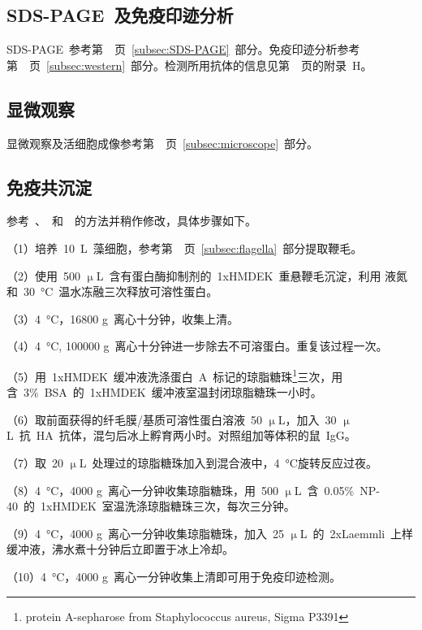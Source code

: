 \subsection{SDS-PAGE\ 及免疫印迹分析}
SDS-PAGE\ 参考第\ \pageref{subsec:SDS-PAGE}\ 页\ \ref{subsec:SDS-PAGE}\ 部分。免疫印迹分析参考
第\ \pageref{subsec:western}\ 页\ \ref{subsec:western}\ 部分。检测所用抗体的信息见第\
\pageref{appen:H}\ 页的附录\ H。

\subsection{显微观察}
显微观察及活细胞成像参考第\ \pageref{subsec:microscope}\ 页\ \ref{subsec:microscope}\ 部分。

\subsection{免疫共沉淀}\label{subsec:CoIP}
参考\ \citet{Richey2013}、\citet{Fowkes1998}\ 和\ \citet{Silva2012}\ 的方法并稍作修改，具体步骤如下。

（1）培养\ \SI{10}{\L}\ 藻细胞，参考第\ \pageref{subsec:flagella}\ 页\ \ref{subsec:flagella}\ 部分提取鞭毛。

（2）使用\ 500 $\upmu$L\ 含有蛋白酶抑制剂的\ 1xHMDEK\ 重悬鞭毛沉淀，利用
液氮和\ \SI{30}{\degreeCelsius}\ 温水冻融三次释放可溶性蛋白。

（3）\SI{4}{\degreeCelsius}，16800 g\ 离心十分钟，收集上清。

（4）\SI{4}{\degreeCelsius}, 100000 g\ 离心十分钟进一步除去不可溶蛋白。重复该过程一次。

（5）用\ 1xHMDEK\ 缓冲液洗涤蛋白\ A\ 标记的琼脂糖珠\footnote{protein A-sepharose from Staphylococcus aureus, Sigma P3391}三次，用含\ 3\%\ BSA\ 的\ 1xHMDEK\ 缓冲液室温封闭琼脂糖珠一小时。

（6）取前面获得的纤毛膜/基质可溶性蛋白溶液\ 50 $\upmu$L，加入\ 30 $\upmu$L\ 抗\ HA\ 抗体，混匀后冰上孵育两小时。对照组加等体积的鼠\ IgG。

（7）取\ 20 $\upmu$L\ 处理过的琼脂糖珠加入到混合液中，\SI{4}{\degreeCelsius}旋转反应过夜。

（8）\SI{4}{\degreeCelsius}，4000 g\ 离心一分钟收集琼脂糖珠，用\ 500 $\upmu$L\ 含\ 0.05\%\ NP-40\ 的\ 1xHMDEK\ 室温洗涤琼脂糖珠三次，每次三分钟。

（9）\SI{4}{\degreeCelsius}，4000 g\ 离心一分钟收集琼脂糖珠，加入\ 25 $\upmu$L\ 的\ 2xLaemmli\ 上样缓冲液，沸水煮十分钟后立即置于冰上冷却。

（10）\SI{4}{\degreeCelsius}，4000 g\ 离心一分钟收集上清即可用于免疫印迹检测。

